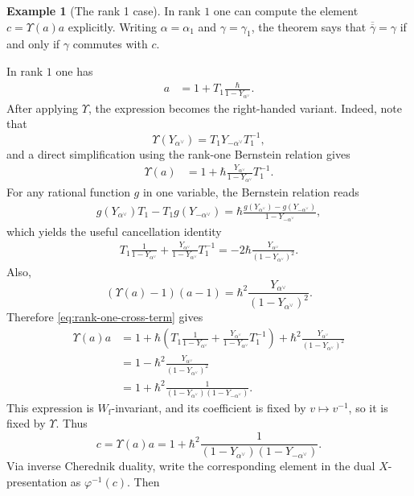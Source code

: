 \documentclass{amsart}
\theoremstyle{definition}
\newtheorem{Ex}[Thm]{Example}
\numberwithin{equation}{section}
\begin{document}
\begin{Ex}[The rank 1 case]
In rank $1$ one can compute the element \(c=\Upsilon(a)a\) explicitly. Writing
$\alpha=\alpha_1$ and $\gamma=\gamma_1$, the theorem says that
$\overline{\overline{\gamma}}=\gamma$ if and only if $\gamma$ commutes with $c$.

In rank $1$ one has
\begin{align*}
    a & = 1 + T_1\frac{\hbar}{1 - Y_{\alpha^\vee}}.
\end{align*}
After applying $\Upsilon$, the expression becomes the right-handed variant. Indeed, note that
\[
\Upsilon(Y_{\alpha^\vee})=T_1Y_{-\alpha^\vee}T_1^{-1},
\]
and a direct simplification using the rank-one Bernstein relation gives
\begin{align*}
    \Upsilon(a) & = 1 + \hbar \frac{Y_{\alpha^\vee}}{1 - Y_{\alpha^\vee}}T_1^{-1}.
\end{align*}
For any rational function $g$ in one variable, the Bernstein relation reads
\begin{align*}
    g(Y_{\alpha^\vee})T_1 - T_1g(Y_{-\alpha^\vee})
    =
    \hbar \frac{g(Y_{\alpha^\vee}) - g(Y_{-\alpha^\vee})}{1 - Y_{-\alpha^\vee}},
\end{align*}
which yields the useful cancellation identity
\begin{align}
\label{eq:rank-one-cross-term}
    T_1\frac{1}{1-Y_{\alpha^\vee}}
    +
    \frac{Y_{\alpha^\vee}}{1-Y_{\alpha^\vee}}T_1^{-1}
    =
    -2\hbar\frac{Y_{\alpha^\vee}}{(1-Y_{\alpha^\vee})^2}.
\end{align}
Also,
\[
(\Upsilon(a)-1)(a-1)
=
\hbar^2\frac{Y_{\alpha^\vee}}{(1-Y_{\alpha^\vee})^2}.
\]
Therefore \eqref{eq:rank-one-cross-term} gives
\begin{align*}
    \Upsilon(a)a
    &=
    1
    +\hbar\left(
        T_1\frac{1}{1-Y_{\alpha^\vee}}
        +
        \frac{Y_{\alpha^\vee}}{1-Y_{\alpha^\vee}}T_1^{-1}
    \right)
    +\hbar^2\frac{Y_{\alpha^\vee}}{(1-Y_{\alpha^\vee})^2}\\
    &=
    1-\hbar^2\frac{Y_{\alpha^\vee}}{(1-Y_{\alpha^\vee})^2}\\
    & = 1 + \hbar^2 \frac{1}{(1 - Y_{\alpha^\vee})(1 - Y_{-\alpha^\vee})}.
\end{align*}
This expression is \(W_{\mathrm f}\)-invariant, and its coefficient is fixed by
\(v\mapsto v^{-1}\), so it is fixed by \(\Upsilon\).
Thus
\[
c=\Upsilon(a)a
=1+\hbar^2\frac{1}{(1 - Y_{\alpha^\vee})(1 - Y_{-\alpha^\vee})}.
\]
Via inverse Cherednik duality, write the corresponding element in the dual
\(X\)-presentation as \(\varphi^{-1}(c)\). Then

\end{Ex}
\end{document}
